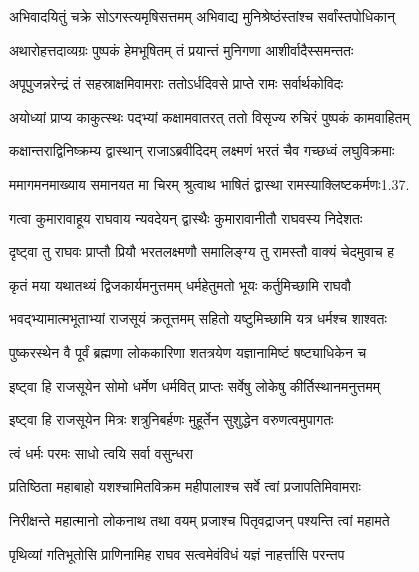 \twolineshloka
{अभिवादयितुं चक्रे सोऽगस्त्यमृषिसत्तमम्}
{अभिवाद्य मुनिश्रेष्ठंस्तांश्च सर्वांस्तपोधिकान्}%

\twolineshloka
{अथारोहत्तदाव्यग्रः पुष्पकं हेमभूषितम्}
{तं प्रयान्तं मुनिगणा आशीर्वादैस्समन्ततः}%

\twolineshloka
{अपूपुजन्नरेन्द्रं तं सहस्राक्षमिवामराः}
{ततोऽर्धदिवसे प्राप्ते रामः सर्वार्थकोविदः}%

\twolineshloka
{अयोध्यां प्राप्य काकुत्स्थः पद्भ्यां कक्षामवातरत्}
{ततो विसृज्य रुचिरं पुष्पकं कामवाहितम्}%

\twolineshloka
{कक्षान्तराद्विनिष्क्रम्य द्वास्थान् राजाऽब्रवीदिदम्}
{लक्ष्मणं भरतं चैव गच्छध्वं लघुविक्रमाः}%

\twolineshloka
{ममागमनमाख्याय समानयत मा चिरम्}
{श्रुत्वाथ भाषितं द्वास्था रामस्याक्लिष्टकर्मणः1.37.}%

\twolineshloka
{गत्वा कुमारावाहूय राघवाय न्यवदेयन्}
{द्वास्थैः कुमारावानीतौ राघवस्य निदेशतः}%

\twolineshloka
{दृष्ट्वा तु राघवः प्राप्तौ प्रियौ भरतलक्ष्मणौ}
{समालिङ्ग्य तु रामस्तौ वाक्यं चेदमुवाच ह}%

\twolineshloka
{कृतं मया यथातथ्यं द्विजकार्यमनुत्तमम्}
{धर्महेतुमतो भूयः कर्तुमिच्छामि राघवौ}%

\twolineshloka
{भवद्भ्यामात्मभूताभ्यां राजसूयं क्रतूत्तमम्}
{सहितो यष्टुमिच्छामि यत्र धर्मश्च शाश्वतः}%

\twolineshloka
{पुष्करस्थेन वै पूर्वं ब्रह्मणा लोककारिणा}
{शतत्रयेण यज्ञानामिष्टं षष्ट्याधिकेन च}%

\twolineshloka
{इष्ट्वा हि राजसूयेन सोमो धर्मेण धर्मवित्}
{प्राप्तः सर्वेषु लोकेषु कीर्तिस्थानमनुत्तमम्}%

\twolineshloka
{इष्ट्वा हि राजसूयेन मित्रः शत्रुनिबर्हणः}
{मुहूर्तेन सुशुद्धेन वरुणत्वमुपागतः}%



\onelineshloka
{त्वं धर्मः परमः साधो त्वयि सर्वा वसुन्धरा}%

\twolineshloka
{प्रतिष्ठिता महाबाहो यशश्चामितविक्रम}
{महीपालाश्च सर्वे त्वां प्रजापतिमिवामराः}%

\twolineshloka
{निरीक्षन्ते महात्मानो लोकनाथ तथा वयम्}
{प्रजाश्च पितृवद्राजन् पश्यन्ति त्वां महामते}%

\twolineshloka
{पृथिव्यां गतिभूतोसि प्राणिनामिह राघव}
{सत्वमेवंविधं यज्ञं नाहर्त्तासि परन्तप}%

